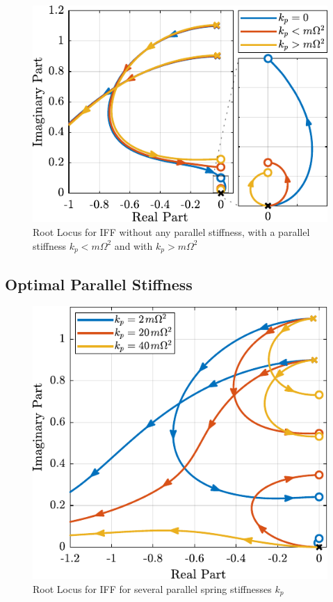 \documentclass{ISMA_USD2020}
\begin{document}
\begin{figure}[htbp]
\centering
\includegraphics[scale=1]{figs/root_locus_iff_kp.pdf}
\caption{\label{fig:root_locus_iff_kp}Root Locus for IFF without any parallel stiffness, with a parallel stiffness \(k_p < m \Omega^2\) and with \(k_p > m \Omega^2\)}
\end{figure}


\subsection{Optimal Parallel Stiffness}
\label{sec:orgd19b212}

\begin{figure}[htbp]
\centering
\includegraphics[scale=1]{figs/root_locus_iff_kps.pdf}
\caption{\label{fig:root_locus_iff_kps}Root Locus for IFF for several parallel spring stiffnesses \(k_p\)}
\end{figure}
\end{document}
